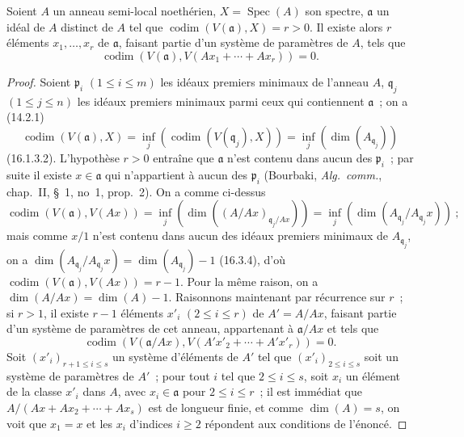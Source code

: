 
\begin{proposition}[16.3.8]
\label{0.16.3.8-fr}
Soient $A$ un anneau semi-local noethérien, $X=\operatorname{Spec}(A)$ son
spectre, $\mathfrak{a}$ un idéal de $A$ distinct de $A$ tel que
$\operatorname{codim}(V(\mathfrak{a}),X)=r>0$. Il existe alors $r$ éléments
$x_1,\ldots,x_r$ de $\mathfrak{a}$, faisant partie d'un système de paramètres
de $A$, tels que
\[
  \operatorname{codim}(V(\mathfrak{a}),
  V(Ax_1+\cdots+Ax_r))=0.
\]
\end{proposition}

\begin{proof}
Soient $\mathfrak{p}_i$ $(1\leq i\leq m)$ les idéaux premiers minimaux de
l'anneau $A$, $\mathfrak{q}_j$ $(1\leq j\leq n)$ les idéaux premiers minimaux
parmi ceux qui contiennent $\mathfrak{a}$~; on a (14.2.1)
\[
  \operatorname{codim}(V(\mathfrak{a}),X)
  =\inf_j(\operatorname{codim}(V(\mathfrak{q}_j),X))
  =\inf_j(\dim(A_{\mathfrak{q}_j}))
\]
(16.1.3.2). L'hypothèse $r>0$ entraîne que $\mathfrak{a}$ n'est contenu dans
aucun des $\mathfrak{p}_i$~; par suite il existe $x\in\mathfrak{a}$ qui
n'appartient à aucun des $\mathfrak{p}_i$ (Bourbaki, \emph{Alg.~comm.},
chap.~II, \S~1, no~1, prop.~2). On a comme ci-dessus
\[
  \operatorname{codim}(V(\mathfrak{a}),V(Ax))
  =\inf_j(\dim((A/Ax)_{\mathfrak{q}_j/Ax}))
  =\inf_j(\dim(A_{\mathfrak{q}_j}/A_{\mathfrak{q}_j}x))~;
\]
mais comme $x/1$ n'est contenu dans aucun des idéaux premiers minimaux de
$A_{\mathfrak{q}_j}$, on a
$\dim(A_{\mathfrak{q}_j}/A_{\mathfrak{q}_j}x)
=\dim(A_{\mathfrak{q}_j})-1$ (16.3.4), d'où
$\operatorname{codim}(V(\mathfrak{a}),V(Ax))=r-1$. Pour la même raison, on a
$\dim(A/Ax)=\dim(A)-1$. Raisonnons maintenant par récurrence sur $r$~; si
$r>1$, il existe $r-1$ éléments $x'_i$ $(2\leq i\leq r)$ de $A'=A/Ax$,
faisant partie d'un système de paramètres de cet anneau, appartenant à
$\mathfrak{a}/Ax$ et tels que
\[
  \operatorname{codim}(V(\mathfrak{a}/Ax),
  V(A'x'_2+\cdots+A'x'_r))=0.
\]
Soit $(x'_i)_{r+1\leq i\leq s}$ un système d'éléments de $A'$ tel que
$(x'_i)_{2\leq i\leq s}$ soit un système de paramètres de $A'$~; pour tout
$i$ tel que $2\leq i\leq s$, soit $x_i$ un élément de la classe $x'_i$ dans
$A$, avec $x_i\in\mathfrak{a}$ pour $2\leq i\leq r$~; il est immédiat que
$A/(Ax+Ax_2+\cdots+Ax_s)$ est de longueur finie, et comme $\dim(A)=s$, on voit
que $x_1=x$ et les $x_i$ d'indices $i\geq2$ répondent aux conditions de
l'énoncé.
\end{proof}

